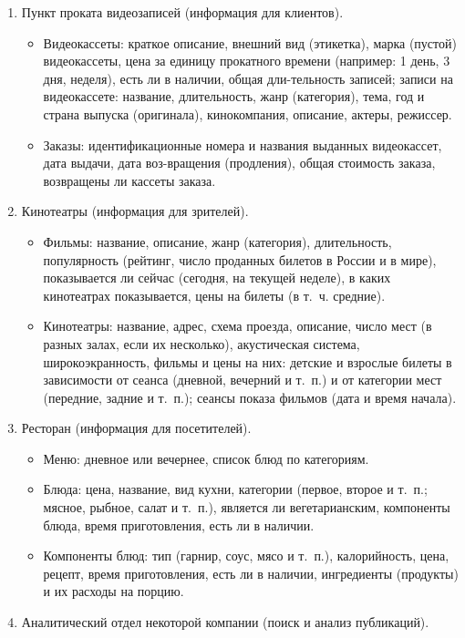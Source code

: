 \documentclass[12pt, openany, twoside]{book} %
\begin{document}
\begin{enumerate}
\begin{itemize}
\end{itemize}
\item Пункт проката видеозаписей (информация для клиентов).
\begin{itemize}
\item Видеокассеты: краткое описание, внешний вид (этикетка), марка (пустой) видеокассеты, цена за единицу прокатного времени (например: 1 день, 3 дня, неделя), есть ли в наличии, общая дли-тельность записей; записи на видеокассете: название, длительность, жанр (категория), тема, год и страна выпуска (оригинала), кинокомпания, описание, актеры, режиссер.
\item Заказы: идентификационные номера и названия выданных видеокассет, дата выдачи, дата воз-вращения (продления), общая стоимость заказа, возвращены ли кассеты заказа.
\end{itemize}
\item Кинотеатры (информация для зрителей).
\begin{itemize}
\item Фильмы: название, описание, жанр (категория), длительность, популярность (рейтинг, число проданных билетов в России и в мире), показывается ли сейчас (сегодня, на текущей неделе), в каких кинотеатрах показывается, цены на билеты (в т.~ч. средние).
\item Кинотеатры: название, адрес, схема проезда, описание, число мест (в разных залах, если их несколько), акустическая система, широкоэкранность, фильмы и цены на них: детские и взрослые билеты в зависимости от сеанса (дневной, вечерний и т.~п.) и от категории мест (передние, задние и т.~п.); сеансы показа фильмов (дата и время начала).
\end{itemize}
\item Ресторан (информация для посетителей).
\begin{itemize}
\item Меню: дневное или вечернее, список блюд по категориям.
\item Блюда: цена, название, вид кухни, категории (первое, второе и т.~п.; мясное, рыбное, салат и т.~п.), является ли вегетарианским, компоненты блюда, время приготовления, есть ли в наличии.
\item Компоненты блюд: тип (гарнир, соус, мясо и т.~п.), калорийность, цена, рецепт, время приготовления, есть ли в наличии, ингредиенты (продукты) и их расходы на порцию.
\end{itemize}
\item Аналитический отдел некоторой компании (поиск и анализ публикаций).
\begin{itemize}

\end{itemize}
\end{enumerate}
\end{document}
